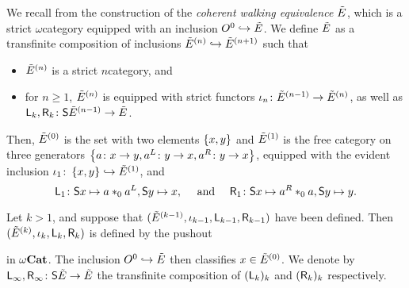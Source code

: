 \begin{dfn} \label{dfn:strict_walking_equivalence}
    We recall from \cite{hadzihasanovic2024model} the construction of the \emph{coherent walking equivalence \( \tilde E \)}, which is a strict \( \omega \)\nbd category equipped with an inclusion \( O^{0} \hookrightarrow \tilde E \).
    We define \( \tilde E \) as a transfinite composition of inclusions \( \tilde E^{(n)} \hookrightarrow \tilde E^{(n + 1)} \) such that
    \begin{itemize}
        \item \( \tilde E^{(n)} \) is a strict \( n \)\nbd category, and
        \item for \( n \geq 1 \), \( \tilde E^{(n)} \) is equipped with strict functors \( \iota_n \colon \tilde E^{(n - 1)} \to \tilde E^{(n)} \),
    as well as \( \mathsf{L}_k, \mathsf{R}_k \colon \mathsf{S}{\tilde E^{(n - 1)}} \to \tilde E \).
    \end{itemize}
    Then, \( \tilde E^{(0)} \) is the set with two elements \( \left\{ {x, y} \right\} \) and \( \tilde E^{(1)} \) is the free category on three generators \( \left\{ {a \colon x \to y, a^L \colon y \to x, a^R \colon y \to x} \right\} \), equipped with the evident inclusion \( \iota_1 \colon \left\{ {x, y} \right\} \hookrightarrow \tilde E^{(1)} \), and
    \begin{equation*}
        \mathsf{L}_1 \colon \mathsf{S}{x} \mapsto a *_{0} a^L, \mathsf{S}{y} \mapsto x, \quad\text{ and }\quad \mathsf{R}_1 \colon \mathsf{S}{x} \mapsto a^R *_{0} a, \mathsf{S}{y} \mapsto y.
    \end{equation*}

    Let \( k > 1 \), and suppose that \( (\tilde E^{(k - 1)}, \iota_{k - 1}, \mathsf{L}_{k - 1}, \mathsf{R}_{k - 1}) \) have been defined.
    Then \( (\tilde E^{(k)}, \iota_{k}, \mathsf{L}_{k}, \mathsf{R}_{k}) \) is defined by the pushout
    \begin{center}
    \end{center}
    in \( {\omega\mathbf{Cat}} \).
    The inclusion \( O^{0} \hookrightarrow \tilde E \) then classifies \( x \in \tilde E^{(0)} \).
    We denote by \( \mathsf{L}_\infty, \mathsf{R}_\infty \colon \mathsf{S}{\tilde E} \to \tilde E \) the transfinite composition of \( (\mathsf{L}_k)_k \) and \( (\mathsf{R}_k)_k \) respectively.
\end{dfn}


